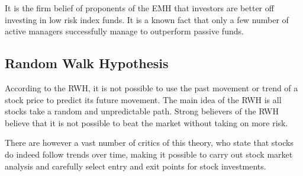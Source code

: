 It is the firm belief of proponents of the EMH that investors are better off investing in low risk index funds. It is a known fact that only a few number of active managers successfully manage to outperform passive funds.

\subsection{Random Walk Hypothesis}

According to the RWH, it is not possible to use the past movement or trend of a stock price to predict its future movement. The main idea of the RWH is all stocks take a random and unpredictable path. Strong believers of the RWH believe that it is not possible to beat the market without taking on more risk.

There are however a vast number of critics of this theory, who state that stocks do indeed follow trends over time, making it possible to carry out stock market analysis and carefully select entry and exit points for stock investments.